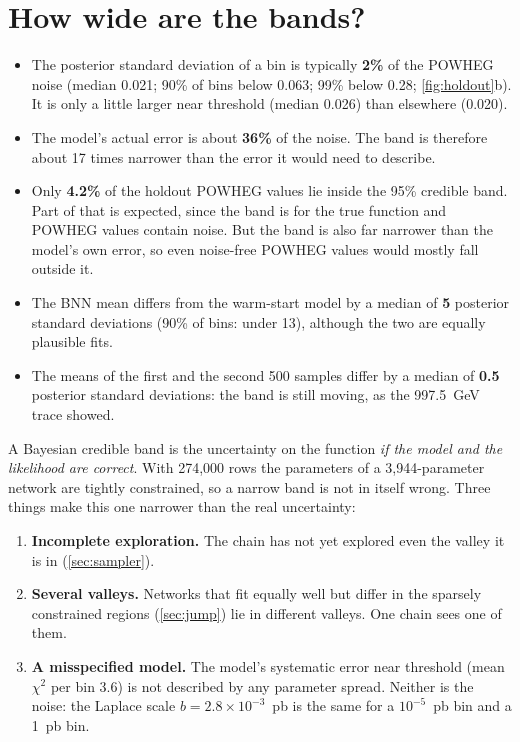 \documentclass[11pt]{article}
\begin{document}
\section{How wide are the bands?}
\label{sec:bands}

\begin{itemize}
  \item The posterior standard deviation of a bin is typically \textbf{2\%} of the
    POWHEG noise (median 0.021; 90\% of bins below 0.063; 99\% below 0.28;
    \cref{fig:holdout}b). It is only a little larger near threshold (median 0.026) than
    elsewhere (0.020).
  \item The model's actual error is about \textbf{36\%} of the noise. The band is
    therefore about 17 times narrower than the error it would need to describe.
  \item Only \textbf{4.2\%} of the holdout POWHEG values lie inside the 95\% credible band.
    Part of that is expected, since the band is for the true function and POWHEG values
    contain noise. But the band is also far narrower than the model's own error, so
    even noise-free POWHEG values would mostly fall outside it.
  \item The BNN mean differs from the warm-start model by a median of \textbf{5}
    posterior standard deviations (90\% of bins: under 13), although the two are
    equally plausible fits.
  \item The means of the first and the second 500 samples differ by a median of
    \textbf{0.5} posterior standard deviations: the band is still moving, as the
    997.5~GeV trace showed.
\end{itemize}

\begin{assume}
A Bayesian credible band is the uncertainty on the function \emph{if the model and the
likelihood are correct}. With 274,000 rows the parameters of a 3,944-parameter network
are tightly constrained, so a narrow band is not in itself wrong. Three things make this
one narrower than the real uncertainty:
\begin{enumerate}
  \item \textbf{Incomplete exploration.} The chain has not yet explored even the valley
    it is in (\cref{sec:sampler}).
  \item \textbf{Several valleys.} Networks that fit equally well but differ in the
    sparsely constrained regions (\cref{sec:jump}) lie in different valleys. One chain
    sees one of them.
  \item \textbf{A misspecified model.} The model's systematic error near threshold
    (mean $\chi^2$ per bin 3.6) is not described by any parameter spread. Neither is
    the noise: the Laplace scale $b = 2.8 \times 10^{-3}$~pb is the same for a
    $10^{-5}$~pb bin and a 1~pb bin.
\end{enumerate}
\end{assume}
\end{document}

